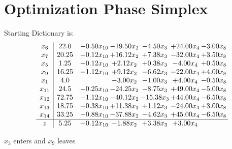 \documentclass[9pt]{article}
\begin{document}
\section{Optimization Phase Simplex}
Starting Dictionary is:
\[\begin{array}{c| c c@{\hskip 2pt} c@{\hskip 2pt} c@{\hskip 2pt} c@{\hskip 2pt} c@{\hskip 2pt} }
 x_{6}   &  22.0 & -0.50 x_{10} & -19.50 x_{2} & -4.50 x_{3} & + 24.00 x_{4} & -3.00 x_{8}\\
 x_{7}   &  20.25 & +  0.12 x_{10} & + 16.12 x_{2} & +  7.38 x_{3} & -32.00 x_{4} & +  3.50 x_{8}\\
 x_{5}   &  1.25 & +  0.12 x_{10} & +  2.12 x_{2} & +  0.38 x_{3} & -4.00 x_{4} & +  0.50 x_{8}\\
 x_{9}   &  16.25 & +  1.12 x_{10} & +  9.12 x_{2} & -6.62 x_{3} & -22.00 x_{4} & +  4.00 x_{8}\\
 x_{1}   &  4.0  &   & -3.00 x_{2} & -1.00 x_{3} & +  4.00 x_{4} & -0.50 x_{8}\\
 x_{11}   &  24.5 & -0.25 x_{10} & -24.25 x_{2} & -8.75 x_{3} & + 49.00 x_{4} & -5.00 x_{8}\\
 x_{12}   &  72.75 & -1.12 x_{10} & -40.12 x_{2} & -15.38 x_{3} & + 44.00 x_{4} & -6.50 x_{8}\\
 x_{13}   &  18.75 & +  0.38 x_{10} & + 11.38 x_{2} & +  1.12 x_{3} & -24.00 x_{4} & +  3.00 x_{8}\\
 x_{14}   &  33.25 & -0.88 x_{10} & -37.88 x_{2} & -4.62 x_{3} & + 45.00 x_{4} & -6.50 x_{8}\\
\hline
z    &  5.25 & +  0.12 x_{10} & -1.88 x_{2} & +  3.38 x_{3} & +  3.00 x_{4} &   \\
\end{array}\]


 $ x_{3} $ enters and $ x_{9} $ leaves 
\end{document}
